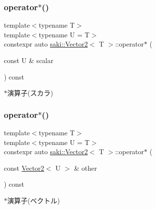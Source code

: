\subsubsection{\texorpdfstring{operator$\ast$()}{operator*()}\hspace{0.1cm}{\footnotesize\ttfamily [1/2]}}
{\footnotesize\ttfamily template$<$typename T$>$ \\
template$<$typename U  = T$>$ \\
constexpr auto \mbox{\hyperlink{classsaki_1_1_vector2}{saki\+::\+Vector2}}$<$ T $>$\+::operator$\ast$ (\begin{DoxyParamCaption}\item[{const U \&}]{scalar }\end{DoxyParamCaption}) const\hspace{0.3cm}{\ttfamily [inline]}}



$\ast$演算子(スカラ) 

\mbox{\label{classsaki_1_1_vector2_a8d7e95b686af377470dd5514f2bb00f3}} 
\subsubsection{\texorpdfstring{operator$\ast$()}{operator*()}\hspace{0.1cm}{\footnotesize\ttfamily [2/2]}}
{\footnotesize\ttfamily template$<$typename T$>$ \\
template$<$typename U  = T$>$ \\
constexpr auto \mbox{\hyperlink{classsaki_1_1_vector2}{saki\+::\+Vector2}}$<$ T $>$\+::operator$\ast$ (\begin{DoxyParamCaption}\item[{const \mbox{\hyperlink{classsaki_1_1_vector2}{Vector2}}$<$ U $>$ \&}]{other }\end{DoxyParamCaption}) const\hspace{0.3cm}{\ttfamily [inline]}}



$\ast$演算子(ベクトル) 

\mbox{\label{classsaki_1_1_vector2_aab202f42563239dfb59d27295d6c7462}} 
